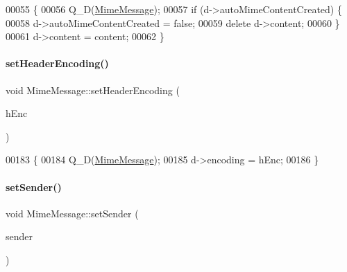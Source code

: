 \begin{DoxyCode}
00055 \{
00056     Q\_D(\hyperlink{class_simple_mail_1_1_mime_message}{MimeMessage});
00057     \textcolor{keywordflow}{if} (d->autoMimeContentCreated) \{
00058       d->autoMimeContentCreated = \textcolor{keyword}{false};
00059       \textcolor{keyword}{delete} d->content;
00060     \}
00061     d->content = content;
00062 \}
\end{DoxyCode}
\mbox{\label{class_simple_mail_1_1_mime_message_af00bcfef5a681b823002e4efb09d0cdc}} 
\paragraph{\texorpdfstring{set\+Header\+Encoding()}{setHeaderEncoding()}}
{\footnotesize\ttfamily void Mime\+Message\+::set\+Header\+Encoding (\begin{DoxyParamCaption}\item[{\hyperlink{class_simple_mail_1_1_mime_part_ae67a2f5406958b95b18bf31a7bbeb5c9}{Mime\+Part\+::\+Encoding}}]{h\+Enc }\end{DoxyParamCaption})}


\begin{DoxyCode}
00183 \{
00184     Q\_D(\hyperlink{class_simple_mail_1_1_mime_message}{MimeMessage});
00185     d->encoding = hEnc;
00186 \}
\end{DoxyCode}
\mbox{\label{class_simple_mail_1_1_mime_message_ab3bd73dba6b0a49443bcdd6d9e603319}} 
\paragraph{\texorpdfstring{set\+Sender()}{setSender()}}
{\footnotesize\ttfamily void Mime\+Message\+::set\+Sender (\begin{DoxyParamCaption}\item[{const \hyperlink{class_simple_mail_1_1_email_address}{Email\+Address} \&}]{sender }\end{DoxyParamCaption})}



